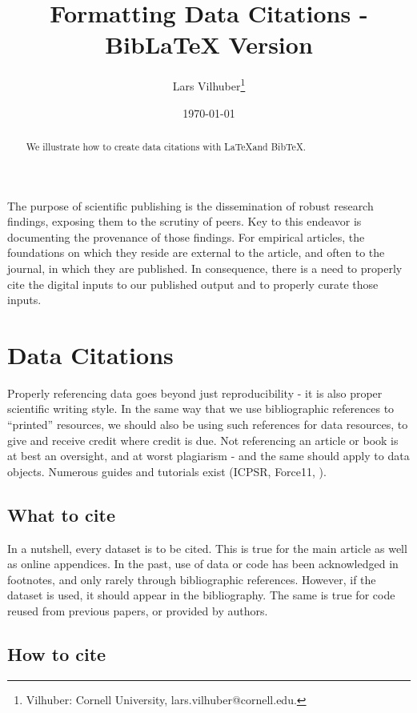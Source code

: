 \documentclass[AEJ]{AEA}
\newcommand{\citet}{\textcite}
\begin{document}
\title{Formatting Data Citations - BibLaTeX Version}
\author{Lars Vilhuber\thanks{%
		Vilhuber: Cornell University, lars.vilhuber@cornell.edu.}}
\date{\today}
\JEL{}
\Keywords{}

\begin{abstract}
	We illustrate how to create data citations with \LaTeX and BibTeX.
\end{abstract}

\maketitle
The purpose of scientific publishing is the dissemination of robust research findings, exposing them to the scrutiny of peers. Key to this endeavor is documenting the provenance of those findings. For empirical articles, the foundations on which they reside are external to the article, and often to the journal, in which they are published.  In consequence, there is a need to properly cite the digital inputs to our published output and to properly curate those inputs.  


\section{Data Citations}
Properly referencing data goes beyond just reproducibility - it is also proper scientific writing style. In the same way that we use bibliographic references to ``printed'' resources, we should also be using such references for data resources, to give and receive credit where credit is due. Not referencing an article or book is at best an oversight, and at worst plagiarism - and the same should apply to data objects. Numerous guides and tutorials exist (ICPSR, Force11, \citet{dataone-l09}).

\subsection{What to cite}

In a nutshell, every dataset is to be cited. This is true for the main article as well as online appendices. In the past, use of data or code has been acknowledged in footnotes, and only rarely through bibliographic references. However,  if the dataset is used, it should appear in the bibliography. The same is true for code reused from previous papers, or provided by authors. 

\subsection{How to cite}
\end{document}
